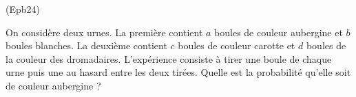 \begin{tiny}(Epb24)\end{tiny} On considère deux urnes. La première contient $a$ boules de couleur aubergine et $b$ boules blanches. La deuxième contient $c$ boules de couleur carotte et $d$ boules de la couleur des dromadaires. L'expérience consiste à tirer une boule de chaque urne puis une au hasard entre les deux tirées. Quelle est la probabilité qu'elle soit de couleur aubergine ? 
